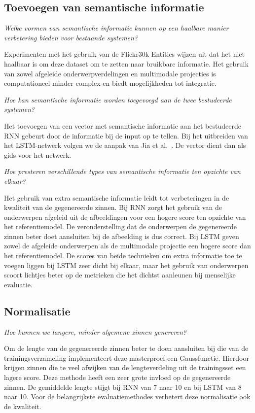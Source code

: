 \subsection{Toevoegen van semantische informatie}
\emph{Welke vormen van semantische informatie kunnen op een haalbare manier verbetering bieden voor bestaande systemen?}

Experimenten met het gebruik van de Flickr30k Entities wijzen uit dat het niet haalbaar is om deze dataset om te zetten naar bruikbare informatie. Het gebruik van zowel afgeleide onderwerpverdelingen en multimodale projecties is computationeel minder complex en biedt mogelijkheden tot integratie.

\emph{Hoe kan semantische informatie worden toegevoegd aan de twee bestudeerde systemen?}

Het toevoegen van een vector met semantische informatie aan het bestudeerde RNN gebeurt door de informatie bij de input op te tellen. Bij het uitbreiden van het LSTM-netwerk volgen we de aanpak van Jia et al.~\cite{Fernando2015}. De vector dient dan als gids voor het netwerk.

\emph{Hoe presteren verschillende types van semantische informatie ten opzichte van elkaar?}

Het gebruik van extra semantische informatie leidt tot verbeteringen in de kwaliteit van de gegenereerde zinnen. 
Bij RNN zorgt het gebruik van de onderwerpen afgeleid uit de afbeeldingen voor een hogere score ten opzichte van het referentiemodel. 
De veronderstelling dat de onderwerpen de gegenereerde zinnen beter doet aansluiten bij de afbeelding is dus correct.
Bij LSTM geven zowel de afgeleide onderwerpen als de multimodale projectie een hogere score dan het referentiemodel. 
De scores van beide technieken om extra informatie toe te voegen liggen bij LSTM zeer dicht bij elkaar, maar het gebruik van onderwerpen scoort lichtjes beter op de metrieken die het dichtst aanleunen bij menselijke evaluatie.

\subsection{Normalisatie}
\emph{Hoe kunnen we langere, minder algemene zinnen genereren?}

Om de lengte van de gegenereerde zinnen beter te doen aansluiten bij die van de trainingsverzameling implementeert deze masterproef een Gaussfunctie. Hierdoor krijgen zinnen die te veel afwijken van de lengteverdeling uit de trainingsset een lagere score. 
Deze methode heeft een zeer grote invloed op de gegenereerde zinnen. De gemiddelde lengte stijgt bij RNN van 7 naar 10 en bij LSTM van 8 naar 10. Voor de belangrijkste evaluatiemethodes verbetert deze normalisatie ook de kwaliteit.

